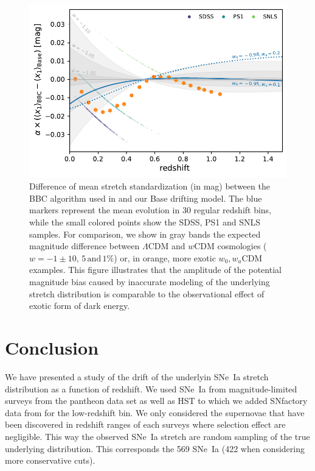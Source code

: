 \documentclass[]{aa} %
\begin{document}
\begin{figure}
    \centering
    \includegraphics[width=\linewidth]{Article_figures/BBC_distmod_w0wa.pdf}
    \caption{ Difference of mean stretch standardization (in mag) between the
        BBC algorithm used in \cite{scolnic2018a} and our Base drifting model.
        The blue markers represent the mean evolution in 30 regular redshift
        bins, while the small colored points show the SDSS, PS1 and SNLS
        samples. For comparison, we show in gray bands the expected magnitude
        difference between $\Lambda$CDM  and $w$CDM cosmologies ($w=-1\pm
        10,\,5\,\mathrm{and}\,1\%$) or, in orange, more exotic $w_0,w_a$CDM
        examples.  This figure illustrates that the amplitude of the potential
    magnitude bias caused by inaccurate modeling of the underlying stretch
distribution is comparable to the observational effect of exotic form of dark
energy.}
    \label{fig:magdrift}
\end{figure}

\section{Conclusion}
\label{sec:ccl}
We have presented a study of the drift of the underlyin SNe~Ia stretch
distribution as a function of redshift.  We used SNe~Ia from magnitude-limited
surveys from the pantheon data set \citep[][SDSS, PS1 and SNLS]{scolnic2018a} as
well as HST to which we added SNfactory data from \cite{rigault2018} for the
low-redshift bin. We only considered the supernovae that have been discovered
in redshift ranges of each surveys where selection effect are negligible. This
way the observed SNe~Ia stretch are random sampling of the true underlying
distribution. This corresponds the 569 SNe~Ia (422 when considering more
conservative cuts).
\end{document}
